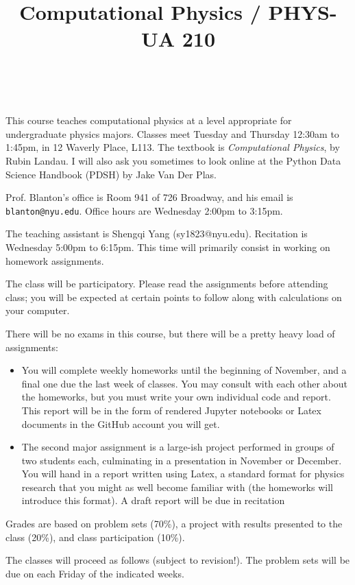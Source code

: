 \documentclass[11pt, preprint]{aastex}
\begin{document}
\title{\bf Computational Physics / PHYS-UA 210}
~
~

\noindent This course teaches computational physics at a level
appropriate for undergraduate physics majors.  Classes meet Tuesday
and Thursday 12:30am to 1:45pm, in 12 Waverly Place, L113.  The
textbook is {\it Computational Physics}, by Rubin Landau. I will also
ask you sometimes to look online at the Python Data Science Handbook
(PDSH) by Jake Van Der Plas.

\noindent Prof. Blanton's office is Room 941 of 726 Broadway, and his
email is {\tt blanton@nyu.edu}.  Office hours are Wednesday 2:00pm to
3:15pm.

\noindent The teaching assistant is Shengqi Yang
(sy1823@nyu.edu). Recitation is Wednesday 5:00pm to 6:15pm. This time
will primarily consist in working on homework assignments.

\noindent The class will be participatory. Please read the assignments
before attending class; you will be expected at certain points to
follow along with calculations on your computer.

\noindent There will be no exams in this course, but there will be a
pretty heavy load of assignments:
\begin{itemize}
\item You will complete weekly homeworks until the beginning of
  November, and a final one due the last week of classes. You may
  consult with each other about the homeworks, but you must write your
  own individual code and report. This report will be in the form of
  rendered Jupyter notebooks or Latex documents in the GitHub account
  you will get.
\item The second major assignment is a large-ish project performed in
  groups of two students each, culminating in a presentation in
  November or December. You will hand in a report written using Latex,
  a standard format for physics research that you might as well become
  familiar with (the homeworks will introduce this format). A draft
  report will be due in recitation
\end{itemize}

\noindent Grades are based on problem sets (70\%), a project with
results presented to the class (20\%), and class participation (10\%).

\noindent The classes will proceed as follows (subject to revision!).
The problem sets will be due on each Friday of the indicated weeks.
\end{document}
